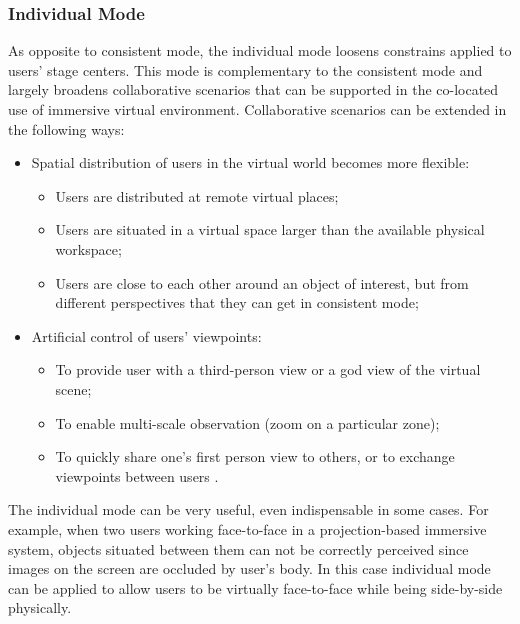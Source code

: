 \subsubsection{Individual Mode}
As opposite to consistent mode, the individual mode loosens constrains applied to users' stage centers. This mode is complementary to the consistent mode and largely broadens collaborative scenarios that can be supported in the co-located use of immersive virtual environment. Collaborative scenarios can be extended in the following ways:

\begin{itemize}
\item Spatial distribution of users in the virtual world becomes more flexible:
\begin{itemize}
  \item Users are distributed at remote virtual places;
  \item Users are situated in a virtual space larger than the available physical workspace;
  \item Users are close to each other around an object of interest, but from different perspectives that they can get in consistent mode;
\end{itemize}
\item Artificial control of users' viewpoints:
\begin{itemize}
  \item To provide user with a third-person view or a god view of the virtual scene;
  \item To enable multi-scale observation (zoom on a particular zone);
  \item To quickly share one's first person view to others, or to exchange viewpoints between users \citep{Lopez2014Exchange}.
\end{itemize}
\end{itemize}

The individual mode can be very useful, even indispensable in some cases. For example, when two users working face-to-face in a projection-based immersive system, objects situated between them can not be correctly perceived since images on the screen are occluded by user's body. In this case individual mode can be applied to allow users to be virtually face-to-face while being side-by-side physically.

